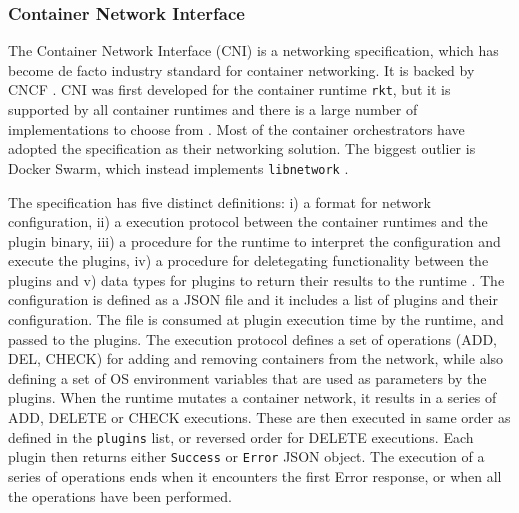 \documentclass[english,12pt,a4paper,pdftex,sci,utf8]{aaltothesis}
\begin{document}

\subsubsection{Container Network Interface} \label{cni}

The Container Network Interface (CNI) \cite{cni} is a networking specification, which has become de facto industry standard for container networking. It is backed by CNCF \cite{qi2020assessing}. CNI was first developed for the container runtime \texttt{rkt}, but it is supported by all container runtimes and there is a large number of implementations to choose from \cite{hausenblas2018container}. Most of the container orchestrators have adopted the specification as their networking solution. The biggest outlier is Docker Swarm, which instead implements \texttt{libnetwork} \cite{libnetwork}.

The specification has five distinct definitions: i) a format for network configuration, ii) a execution protocol between the container runtimes and the plugin binary, iii) a procedure for the runtime to interpret the configuration and execute the plugins, iv) a procedure for deletegating functionality between the plugins and v) data types for plugins to return their results to the runtime \cite{cni}. The configuration is defined as a JSON file and it includes a list of plugins and their configuration. The file is consumed at plugin execution time by the runtime, and passed to the plugins. The execution protocol defines a set of operations (ADD, DEL, CHECK) for adding and removing containers from the network, while also defining a set of OS environment variables that are used as parameters by the plugins. When the runtime mutates a container network, it results in a series of ADD, DELETE or CHECK executions. These are then executed in same order as defined in the \texttt{plugins} list, or reversed order for DELETE executions. Each plugin then returns either \texttt{Success} or \texttt{Error} JSON object. The execution of a series of operations ends when it encounters the first Error response, or when all the operations have been performed.
\end{document}

